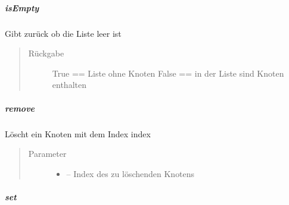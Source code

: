 \documentclass[letterpaper,10pt,ngerman]{sphinxmanual}
\begin{document}
\subparagraph{isEmpty}
\label{\detokenize{com/linuxluigi/edu/list/SinglyLinkedList:isempty}}

\begin{fulllineitems}
\label{\detokenize{com/linuxluigi/edu/list/SinglyLinkedList:com.linuxluigi.edu.list.SinglyLinkedList.isEmpty()}}
Gibt zurück ob die Liste leer ist
\begin{quote}\begin{description}
\item[{Rückgabe}] \leavevmode
True == Liste ohne Knoten False == in der Liste sind Knoten enthalten

\end{description}\end{quote}

\end{fulllineitems}



\subparagraph{remove}
\label{\detokenize{com/linuxluigi/edu/list/SinglyLinkedList:remove}}

\begin{fulllineitems}
\label{\detokenize{com/linuxluigi/edu/list/SinglyLinkedList:com.linuxluigi.edu.list.SinglyLinkedList.remove(int)}}
Löscht ein Knoten mit dem Index index
\begin{quote}\begin{description}
\item[{Parameter}] \leavevmode\begin{itemize}
\item {} 
 -- Index des zu löschenden Knotens

\end{itemize}

\end{description}\end{quote}

\end{fulllineitems}



\subparagraph{set}
\label{\detokenize{com/linuxluigi/edu/list/SinglyLinkedList:set}}
\end{document}
